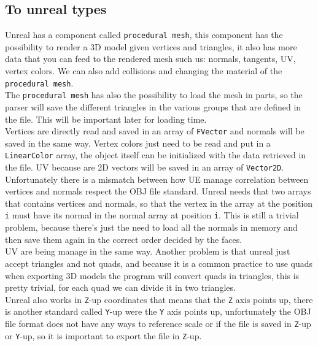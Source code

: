 \subsection{To unreal types}
\noindent
Unreal has a component called \verb|procedural mesh|, this component has the possibility to render a 3D model given vertices and triangles, it also has more data that you can feed to the rendered mesh such us: normals, tangents, UV, vertex colors.
We can also add collisions and changing the material of the \verb|procedural mesh|.\\
The \verb|procedural mesh| has also the possibility to load the mesh in parts, so the parser will save the different triangles in the various groups that are defined in the file.
This will be important later for loading time.\\
Vertices are directly read and saved in an array of \verb|FVector| and normals will be saved in the same way.
Vertex colors just need to be read and put in a \verb|LinearColor| array, the object itself can be initialized with the data retrieved in the file.
UV because are 2D vectors will be saved in an array of \verb|Vector2D|.
Unfortunately there is a mismatch between how \ac{UE} manage correlation between vertices and normals respect the OBJ file standard.
Unreal needs that two arrays that contains vertices and normals, so that the vertex in the array at the position \verb|i| must have its normal in the normal array at position \verb|i|. 
This is still a trivial problem, because there's just the need to load all the normals in memory and then save them again in the correct order decided by the faces.\\
UV are being manage in the same way.
Another problem is that unreal just accept triangles and not quads, and because it is a common practice to use quads when exporting 3D models the program will convert quads in triangles, this is pretty trivial, for each quad we can divide it in two triangles.\\
Unreal also works in \verb|Z|-up coordinates that means that the \verb|Z| axis points up, there is another standard called \verb|Y|-up were the \verb|Y| axis points up, unfortunately the OBJ file format does not have any ways to reference scale or if the file is saved in \verb|Z|-up or \verb|Y|-up,
so it is important to export the file in \verb|Z|-up.